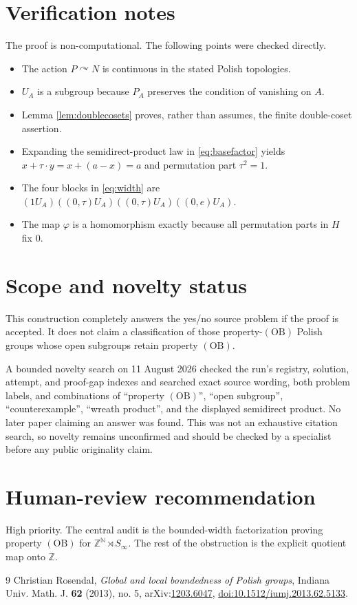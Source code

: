 \documentclass[11pt]{article}
\newcommand{\N}{\mathbb N}
\newcommand{\Z}{\mathbb Z}
\newcommand{\OB}{\mathrm{OB}}
\newcommand{\Sym}{S_\infty}
\begin{document}
\section{Verification notes}

The proof is non-computational.  The following points were checked directly.
\begin{itemize}
\item The action $P\curvearrowright N$ is continuous in the stated Polish
topologies.
\item $U_A$ is a subgroup because $P_A$ preserves the condition of vanishing
on $A$.
\item Lemma \ref{lem:doublecosets} proves, rather than assumes, the finite
double-coset assertion.
\item Expanding the semidirect-product law in \eqref{eq:basefactor} yields
$x+\tau\cdot y=x+(a-x)=a$ and permutation part $\tau^2=1$.
\item The four blocks in \eqref{eq:width} are
$(1U_A)((0,\tau)U_A)((0,\tau)U_A)((0,e)U_A)$.
\item The map $\varphi$ is a homomorphism exactly because all permutation
parts in $H$ fix $0$.
\end{itemize}

\section{Scope and novelty status}

This construction completely answers the yes/no source problem if the proof
is accepted.  It does not claim a classification of those property-$(\OB)$
Polish groups whose open subgroups retain property $(\OB)$.

A bounded novelty search on 11 August 2026 checked the run's registry,
solution, attempt, and proof-gap indexes and searched exact source wording,
both problem labels, and combinations of ``property $(\OB)$'', ``open
subgroup'', ``counterexample'', ``wreath product'', and the displayed
semidirect product.  No later paper claiming an answer was found.  This was
not an exhaustive citation search, so novelty remains unconfirmed and should
be checked by a specialist before any public originality claim.

\section{Human-review recommendation}

High priority.  The central audit is the bounded-width factorization proving
property $(\OB)$ for $\Z^{\N}\rtimes\Sym$.  The rest of the obstruction is the
explicit quotient map onto $\Z$.

\begin{thebibliography}{9}
Christian Rosendal,
\emph{Global and local boundedness of Polish groups},
Indiana Univ. Math. J. \textbf{62} (2013), no. 5,
arXiv:\href{https://arxiv.org/abs/1203.6047}{1203.6047},
\href{https://doi.org/10.1512/iumj.2013.62.5133}{doi:10.1512/iumj.2013.62.5133}.
\end{thebibliography}
\end{document}
